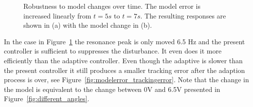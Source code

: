 \begin{figure}[h!]
  \centering %
  \qquad
  \caption{\label{fig:modelerror}Robustness to model changes over time. The model error is increased linearly from $t=5s$ to $t=7s$. The resulting responses are shown in (a) with the model change in (b).}
\end{figure}

In the case in Figure~\ref{fig:modelerror} the resonance peak is only moved 6.5 Hz and the present controller is sufficient to suppresses the disturbance. It even does it more efficiently than the adaptive controller. Even though the adaptive is slower than the present controller it still produces a smaller tracking error after the adaption process is over, see Figure~\ref{fig:modelerror_trackingerror}. Note that the change in the model is equivalent to the change between 0V and 6.5V presented in Figure~\ref{fig:different_angles}.

